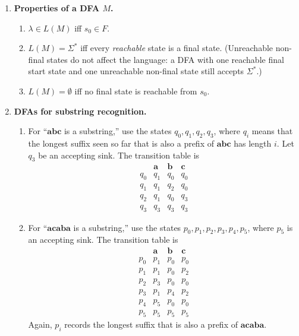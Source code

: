 \documentclass[11pt,openany]{book}
\begin{document}
\begin{enumerate}[{1.}1.]
\item \textbf{Properties of a DFA $M$.}

\begin{enumerate}
\item $\lambda\in L(M)$ iff $s_0\in F$.
\item $L(M)=\Sigma^*$ iff every \emph{reachable} state is a final state.
(Unreachable non-final states do not affect the language: a DFA with one reachable final start state and one unreachable non-final state still accepts $\Sigma^*$.)
\item $L(M)=\emptyset$ iff no final state is reachable from $s_0$.
\end{enumerate}

\item \textbf{DFAs for substring recognition.}

\begin{enumerate}
\item For ``$\pmb{abc}$ is a substring,'' use the states $q_0,q_1,q_2,q_3$, where $q_i$ means that the longest suffix seen so far that is also a prefix of $\pmb{abc}$ has length $i$. Let $q_3$ be an accepting sink. The transition table is
\[
\begin{array}{c|ccc}
 & \pmb{a} & \pmb{b} & \pmb{c} \\\hline
q_0 & q_1 & q_0 & q_0 \\
q_1 & q_1 & q_2 & q_0 \\
q_2 & q_1 & q_0 & q_3 \\
q_3 & q_3 & q_3 & q_3
\end{array}
\]

\item For ``$\pmb{acaba}$ is a substring,'' use the states $p_0,p_1,p_2,p_3,p_4,p_5$, where $p_5$ is an accepting sink. The transition table is
\[
\begin{array}{c|ccc}
 & \pmb{a} & \pmb{b} & \pmb{c} \\\hline
p_0 & p_1 & p_0 & p_0 \\
p_1 & p_1 & p_0 & p_2 \\
p_2 & p_3 & p_0 & p_0 \\
p_3 & p_1 & p_4 & p_2 \\
p_4 & p_5 & p_0 & p_0 \\
p_5 & p_5 & p_5 & p_5
\end{array}
\]
Again, $p_i$ records the longest suffix that is also a prefix of $\pmb{acaba}$.
\end{enumerate}


\end{enumerate}
\end{document}

